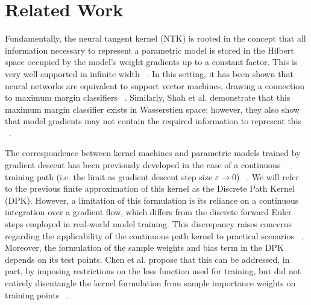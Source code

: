 \section{Related Work}

Fundamentally, the neural tangent kernel (NTK) is rooted in the concept that all information necessary to represent a parametric model is stored in the Hilbert space occupied by the model's weight gradients up to a constant factor. 
This is very well supported in infinite width ~\cite{jacot2018neural}. 
In this setting, it has been shown that neural networks are equivalent to support vector machines, drawing a connection to maximum margin classifiers ~\cite{chen2021equivalence, chizat2020maxmargin}.
Similarly, Shah et al. demonstrate that this maximum margin classifier exists in Wasserstien space; however, they also show that model gradients may not contain the required information to represent this ~\cite{shah2021input}.

The correspondence between kernel machines and parametric models trained by gradient descent has been previously developed in the case of a continuous training path (i.e. the limit as gradient descent step size $\varepsilon \to 0$)
~\cite{domingos2020}. We will refer to the previous finite approximation of this kernel as the Discrete Path Kernel (DPK).
However, a limitation of this formulation is its reliance on a continuous integration over a gradient flow, which differs from the discrete forward Euler steps employed in real-world model training. 
This discrepancy raises concerns regarding the applicability of the continuous path kernel to practical scenarios ~\cite{incudini2022quantum}.
Moreover, the formulation of the sample weights and bias term in the DPK depends on its test points. Chen et al. propose that this can be addressed, in part, by imposing restrictions on the loss function used for training, but did not entirely disentangle the kernel formulation from sample importance weights on training points ~\cite{chen2021equivalence}.

